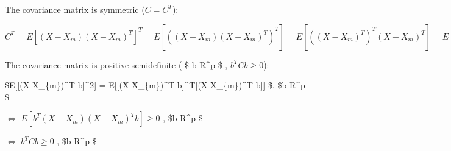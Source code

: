 \documentclass[11pt]{article}
\begin{document}
The covariance matrix is symmetric (\(C = C^T\)):

\(C^T = E[(X-X_{m})(X-X_{m})^T]^T = E[((X-X_{m})(X-X_{m})^T)^T] = E[((X-X_{m})^T)^T(X-X_{m})^T] = E[((X-X_{m})(X-X_{m})^T)] = C\)

The covariance matrix is positive semidefinite ( \$ \forall  b
\in R\^{}p \$ , \(b^T C b \geq 0\)):

\$E{[}{[}(X-X\_\{m\})\^{}T b{]}\^{}2{]} = E{[}{[}(X-X\_\{m\})\^{}T
b{]}\^{}T{[}(X-X\_\{m\})\^{}T b{]}{]}  \$, \$b \in R\^{}p \$

\(\Leftrightarrow\) \(E[b^T (X-X_{m})(X-X_{m})^T b] \geq 0\) , \$b
\in R\^{}p \$

\(\Leftrightarrow\) \(b^T C b \geq 0\) , \$b \in R\^{}p \$


    
    
    
    
\end{document}
